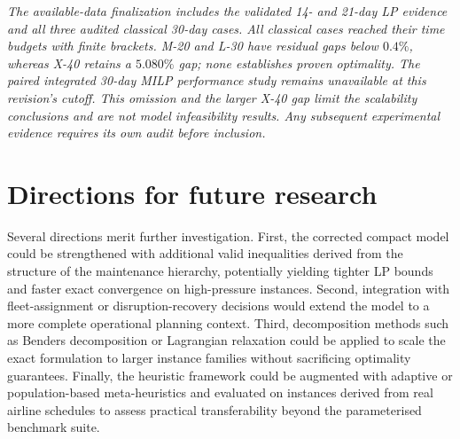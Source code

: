 \textit{The available-data finalization includes the validated 14- and 21-day
LP evidence and all three audited classical 30-day cases. All classical cases
reached their time budgets with finite brackets. M-20 and L-30 have residual
gaps below $0.4\%$, whereas X-40 retains a $5.080\%$ gap; none establishes
proven optimality. The paired integrated 30-day MILP performance study remains
unavailable at this revision's cutoff. This omission and the larger X-40 gap
limit the scalability conclusions and are not model infeasibility results.
Any subsequent experimental evidence requires its own audit before inclusion.}

\section*{Directions for future research}

Several directions merit further investigation. First, the corrected compact model could be strengthened with additional valid inequalities derived from the structure of the maintenance hierarchy, potentially yielding tighter LP bounds and faster exact convergence on high-pressure instances. Second, integration with fleet-assignment or disruption-recovery decisions would extend the model to a more complete operational planning context. Third, decomposition methods such as Benders decomposition or Lagrangian relaxation could be applied to scale the exact formulation to larger instance families without sacrificing optimality guarantees. Finally, the heuristic framework could be augmented with adaptive or population-based meta-heuristics and evaluated on instances derived from real airline schedules to assess practical transferability beyond the parameterised benchmark suite.
